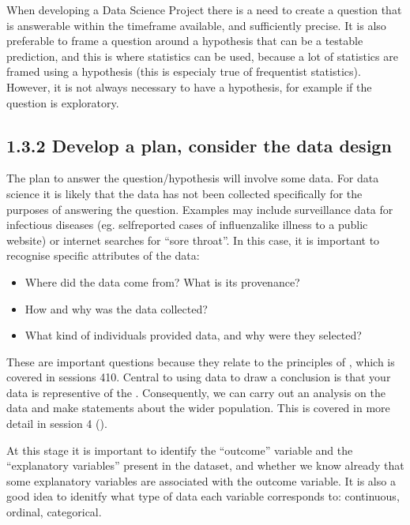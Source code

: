 \documentclass[letterpaper,10pt,english]{jupyterBook}
\begin{document}
\sphinxAtStartPar
When developing a Data Science Project there is a need to create a question that is answerable within the timeframe available, and sufficiently precise. It is also preferable to frame a question around a hypothesis that can be a testable prediction, and this is where statistics can be used, because a lot of statistics are framed using a hypothesis (this is especialy true of frequentist statistics). However, it is not always necessary to have a hypothesis, for example if the question is exploratory.


\subsection{1.3.2 Develop a plan, consider the data design}
\label{\detokenize{01. Introduction:develop-a-plan-consider-the-data-design}}
\sphinxAtStartPar
The plan to answer the question/hypothesis will involve some data. For data science it is likely that the data has not been collected specifically for the purposes of answering the question. Examples may include surveillance data for infectious diseases (eg. self\sphinxhyphen{}reported cases of influenza\sphinxhyphen{}like illness to a public website) or internet searches for “sore throat”. In this case, it is important to recognise specific attributes of the data:
\begin{itemize}
\item {} 
\sphinxAtStartPar
Where did the data come from? What is its provenance?

\item {} 
\sphinxAtStartPar
How and why was the data collected?

\item {} 
\sphinxAtStartPar
What kind of individuals provided data, and why were they selected?

\end{itemize}

\sphinxAtStartPar
These are important questions because they relate to the principles of , which is covered in sessions 4\sphinxhyphen{}10. Central to using data to draw a conclusion is that your  data is representive of the . Consequently, we can carry out an analysis on the data and make statements about the wider population. This is covered in more detail in session 4 ().

\sphinxAtStartPar
At this stage it is important to identify the “outcome” variable and the “explanatory variables” present in the dataset, and whether we know already that some explanatory variables are associated with the outcome variable. It is also a good idea to idenitfy what type of data each variable corresponds to: continuous, ordinal, categorical.
\end{document}
